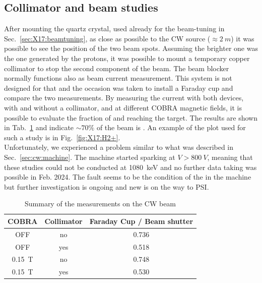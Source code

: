 \begin{refsection}
        \subsection{Collimator and beam studies}
        After mounting the quartz crystal, used already for the beam-tuning in Sec.~\ref{sec:X17:beamtuning}, as close as possible to the CW source ($\approx \SI{2}{m}$) it was possible to see the position of the two beam spots.
        Assuming the brighter one was the one generated by the protons, it was possible to mount a temporary copper collimator to stop the second component of the beam.
        The beam blocker normally functions also as beam current measurement. 
        This system is not designed for that and the occasion was taken to install a Faraday cup and compare the two measurements. 
        By measuring the current with both devices, with and without a collimator, and at different COBRA magnetic fields, it is possible to evaluate the fraction of  and  reaching the target. 
        The results are shown in Tab.~\ref{tab:X17:beam} and indicate $\sim70\%$ of the beam is .
        An example of the plot used for such a study is in Fig.~\ref{fig:X17:H2+}.\\

        \noindent
        Unfortunately, we experienced a problem similar to what was described in Sec.~\ref{sec:cw:machine}. 
        The machine started sparking at $V>\SI{800}{V}$, meaning that these studies could not be conducted at \SI{1080}{keV} and no further data taking was possible in Feb. 2024.
        The fault seems to be the condition of the  in the machine but further investigation is ongoing and new  is on the way to PSI.

        \begin{table}[]
            \centering
            \begin{tabular}{c|c|c}
                \hline
                COBRA & Collimator & Faraday Cup / Beam shutter \\
                \hline
                \hline
                OFF & no & 0.736 \\
                OFF & yes & 0.518 \\
                \SI{0.15}{T} & no & 0.748 \\
                \SI{0.15}{T} & yes & 0.530 \\
                \hline
            \end{tabular}
            \caption{Summary of the measurements on the CW beam}
            \label{tab:X17:beam}
        \end{table}


\end{refsection}
